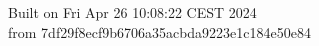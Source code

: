{\noindent Built on Fri Apr 26 10:08:22 CEST 2024} \\ 
 {\noindent from 7df29f8ecf9b6706a35acbda9223e1c184e50e84}
